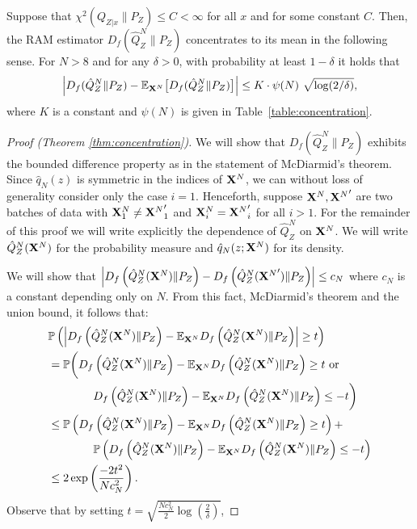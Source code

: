 \begin{theorem}
Suppose that ${\chi^2\left(Q_{Z|x} \| P_Z\right) \leq C < \infty}$ for all $x$ and for some constant $C$.
Then, the RAM estimator ${D_f( \hat{Q}_Z^N \| P_Z)}$ concentrates to its mean in the following sense. 
For $N>8$ and for any $\delta >0$, with probability at least $1-\delta$ it holds that
\begin{align*}
    \left| D_f( \hat{Q}_Z^N \| P_Z) - \mathbb{E}_{\mathbf{X}^N} \bigl[D_f(\hat{Q}_Z^N \| P_Z)\bigr] \right| \leq {K \cdot \psi(N)} \  \sqrt{\log (2/\delta)},
\end{align*}
where $K$ is a constant and $\psi(N)$ is given in Table~\ref{table:concentration}.
\end{theorem}
\begin{proof}[Proof (Theorem \ref{thm:concentration})]
We will show that $D_f\left( \hat{Q}_Z^N \| P_Z\right)$ exhibits the bounded difference property as in the statement of McDiarmid's theorem.
Since $\hat{q}_N(z)$ is symmetric in the indices of $\mathbf{X}^N$, we can without loss of generality consider only the case $i=1$.
Henceforth, suppose $\mathbf{X}^N, {\mathbf{X}^N}'$ are two batches of data with $\mathbf{X}^N_1 \not= {\mathbf{X}^N}'_1$ and $\mathbf{X}^N_i = {\mathbf{X}^N}'_i$ for all $i > 1$. 
For the remainder of this proof we will write explicitly the dependence of $\hat{Q}_Z^N$ on $\mathbf{X}^N$. 
We will write $\hat{Q}_Z^N(\mathbf{X}^N)$ for the probability measure and $\hat{q}_N(z; \mathbf{X}^N)$ for its density.


We will show that $\left|D_f\left( \hat{Q}_Z^N(\mathbf{X}^N) \| P_Z\right) - D_f\left( \hat{Q}_Z^N({\mathbf{X}^N}') \| P_Z\right)\right| \leq c_N$ where $c_N$ is a constant depending only on $N$.
From this fact, McDiarmid's theorem and the union bound, it follows that:
\begin{align*}
    &\mathbb{P}\left( \left| D_f\left( \hat{Q}_Z^N(\mathbf{X}^N) \| P_Z\right) - \mathbb{E}_{\mathbf{X}^N} D_f\left( \hat{Q}_Z^N(\mathbf{X}^N) \| P_Z\right) \right|\geq t \right) \\
    &= \mathbb{P}\bigg( D_f\left( \hat{Q}_Z^N(\mathbf{X}^N) \| P_Z\right) - \mathbb{E}_{\mathbf{X}^N} D_f\left( \hat{Q}_Z^N(\mathbf{X}^N) \| P_Z\right) \geq t \text{ or }\\
    & \qquad \qquad D_f\left( \hat{Q}_Z^N(\mathbf{X}^N) \| P_Z\right) - \mathbb{E}_{\mathbf{X}^N} D_f\left( \hat{Q}_Z^N(\mathbf{X}^N) \| P_Z\right) \leq -t\bigg) \\
    &\leq \mathbb{P}\left( D_f\left( \hat{Q}_Z^N(\mathbf{X}^N) \| P_Z\right) - \mathbb{E}_{\mathbf{X}^N} D_f\left( \hat{Q}_Z^N(\mathbf{X}^N) \| P_Z\right) \geq t \right) 
    + \\
    & \qquad \qquad \mathbb{P}\left( D_f\left( \hat{Q}_Z^N(\mathbf{X}^N) \| P_Z\right) - \mathbb{E}_{\mathbf{X}^N} D_f\left( \hat{Q}_Z^N(\mathbf{X}^N) \| P_Z\right) \leq -t\right) \\
    &\leq 2 \exp\left(\frac{-2 t^2 }{Nc^2_N} \right).
\end{align*}
Observe that by setting $t = \sqrt{\frac{Nc_N^2}{2} \log\left(\frac{2}{\delta}\right)}$, 


\end{proof}
